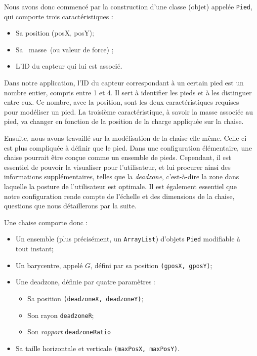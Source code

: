\documentclass{polytech/polytech}
\begin{document}
Nous avons donc commencé par la construction d'une classe (objet) appelée \texttt{Pied}, qui comporte trois caractéristiques :
\begin{itemize}
\item Sa position (posX, posY);
\item Sa \guillemotleft ~masse~\guillemotright (ou valeur de force) ;
\item L’ID du capteur qui lui est associé.
\end{itemize}

Dans notre application, l'ID du capteur correspondant à un certain pied est un nombre entier, compris entre 1 et 4. Il sert à identifier les pieds et à les distinguer entre eux. Ce nombre, avec la position, sont les deux caractéristiques requises pour modéliser un pied. La troisième caractéristique, à savoir la masse associée au pied, va changer en fonction de la position de la charge appliquée sur la chaise.

Ensuite, nous avons travaillé sur la modélisation de la chaise elle-même. 
Celle-ci est plus compliquée à définir que le pied. 
Dans une configuration élémentaire, une chaise pourrait être conçue comme un ensemble de pieds.
Cependant, il est essentiel de pouvoir la visualiser pour l'utilisateur, et lui procurer ainsi des informations supplémentaires, telles que la \textit{deadzone}, c'est-à-dire la zone dans laquelle la posture de l'utilisateur est optimale.
Il est également essentiel que notre configuration rende compte de l'échelle et des dimensions de la chaise, questions que nous détaillerons par la suite.

Une chaise comporte donc :
\begin{itemize}
\item Un ensemble (plus précisément, un \texttt{ArrayList}) d'objets \texttt{Pied} modifiable à tout instant;
\item Un barycentre, appelé $G$, défini par sa position \texttt{(gposX, gposY)};
\item Une deadzone, définie par quatre paramètres :
\begin{itemize}
\item Sa position \texttt{(deadzoneX, deadzoneY)};
\item Son rayon \texttt{deadzoneR};
\item Son \textit{rapport} \texttt{deadzoneRatio}
\end{itemize}
\item Sa taille horizontale et verticale \texttt{(maxPosX, maxPosY)}.
\end{itemize}
\end{document}
